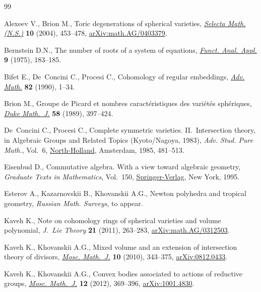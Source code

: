 \documentclass[10pt,a4paper]{amsart}
\numberwithin{equation}{section}
\theoremstyle{definition}
\begin{document}
\begin{thebibliography}{99}
\footnotesize\itemsep=-0.5pt

Alexeev V., Brion M., Toric degenerations of spherical varieties,
 \href{https://doi.org/10.1007/s00029-005-0396-8}{\textit{Selecta Math. (N.S.)}} \textbf{10} (2004), 453--478, \href{https://arxiv.org/abs/math.AG/0403379}{arXiv:math.AG/0403379}.

Bernstein D.N., The number of roots of a system of equations, \href{https://doi.org/10.1007/BF01075595}{\textit{Funct.
 Anal. Appl.}} \textbf{9} (1975), 183--185.

Bifet E., De~Concini C., Procesi C., Cohomology of regular embeddings,
 \href{https://doi.org/10.1016/0001-8708(90)90082-X}{\textit{Adv. Math.}} \textbf{82} (1990), 1--34.

Brion M., Groupe de {P}icard et nombres caract\'{e}ristiques des
 vari\'{e}t\'{e}s sph\'{e}riques, \href{https://doi.org/10.1215/S0012-7094-89-05818-3}{\textit{Duke Math.~J.}} \textbf{58} (1989), 397--424.

De~Concini C., Procesi C., Complete symmetric varieties. {II}.~{I}ntersection
 theory, in Algebraic Groups and Related Topics ({K}yoto/{N}agoya, 1983),
 \textit{Adv. Stud. Pure Math.}, Vol.~6, \href{https://doi.org/10.2969/aspm/00610481}{North-Holland}, Amsterdam, 1985, 481--513.

Eisenbud D., Commutative algebra. With a view toward algebraic geometry,
 \textit{Graduate Texts in Mathematics}, Vol.~150, \href{https://doi.org/10.1007/978-1-4612-5350-1}{Springer-Verlag}, New York,
 1995.

Esterov A., Kazarnovskii B., Khovanskii A.G., Newton polyhedra and tropical
 geometry, \textit{Russian Math. Surveys}, {t}o appear.

Kaveh K., Note on cohomology rings of spherical varieties and volume
 polynomial, \textit{J.~Lie Theory} \textbf{21} (2011), 263--283,
 \href{https://arxiv.org/abs/math.AG/0312503}{arXiv:math.AG/0312503}.

Kaveh K., Khovanskii A.G., Mixed volume and an extension of intersection theory
 of divisors, \href{https://doi.org/10.17323/1609-4514-2010-10-2-343-375}{\textit{Mosc. Math.~J.}} \textbf{10} (2010), 343--375,
 \href{https://arxiv.org/abs/0812.0433}{arXiv:0812.0433}.

Kaveh K., Khovanskii A.G., Convex bodies associated to actions of reductive
 groups, \href{https://doi.org/10.17323/1609-4514-2012-12-2-369-396}{\textit{Mosc. Math.~J.}} \textbf{12} (2012), 369--396, \href{https://arxiv.org/abs/1001.4830}{arXiv:1001.4830}.


\end{thebibliography}
\end{document}

